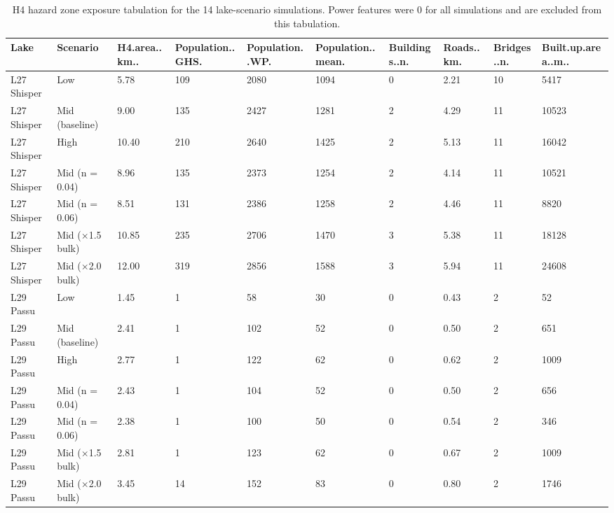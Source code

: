 \begin{table}[ht]
\centering
\scriptsize
\caption{H4 hazard zone exposure tabulation for the 14 lake-scenario simulations. Power features were 0 for all simulations and are excluded from this tabulation.}
\label{tab:h4_exposure}
\begin{tabular}{llllllllll}
\hline
Lake & Scenario & H4.area..km.. & Population..GHS. & Population..WP. & Population..mean. & Buildings..n. & Roads..km. & Bridges..n. & Built.up.area..m.. \\
\hline
L27 Shisper & Low &  5.78 & 109 & 2080 & 1094 & 0 & 2.21 & 10 &  5417 \\
L27 Shisper & Mid (baseline) &  9.00 & 135 & 2427 & 1281 & 2 & 4.29 & 11 & 10523 \\
L27 Shisper & High & 10.40 & 210 & 2640 & 1425 & 2 & 5.13 & 11 & 16042 \\
L27 Shisper & Mid (n = 0.04) &  8.96 & 135 & 2373 & 1254 & 2 & 4.14 & 11 & 10521 \\
L27 Shisper & Mid (n = 0.06) &  8.51 & 131 & 2386 & 1258 & 2 & 4.46 & 11 &  8820 \\
L27 Shisper & Mid ($\times$1.5 bulk) & 10.85 & 235 & 2706 & 1470 & 3 & 5.38 & 11 & 18128 \\
L27 Shisper & Mid ($\times$2.0 bulk) & 12.00 & 319 & 2856 & 1588 & 3 & 5.94 & 11 & 24608 \\
L29 Passu & Low &  1.45 &   1 &   58 &   30 & 0 & 0.43 &  2 &    52 \\
L29 Passu & Mid (baseline) &  2.41 &   1 &  102 &   52 & 0 & 0.50 &  2 &   651 \\
L29 Passu & High &  2.77 &   1 &  122 &   62 & 0 & 0.62 &  2 &  1009 \\
L29 Passu & Mid (n = 0.04) &  2.43 &   1 &  104 &   52 & 0 & 0.50 &  2 &   656 \\
L29 Passu & Mid (n = 0.06) &  2.38 &   1 &  100 &   50 & 0 & 0.54 &  2 &   346 \\
L29 Passu & Mid ($\times$1.5 bulk) &  2.81 &   1 &  123 &   62 & 0 & 0.67 &  2 &  1009 \\
L29 Passu & Mid ($\times$2.0 bulk) &  3.45 &  14 &  152 &   83 & 0 & 0.80 &  2 &  1746 \\
\hline
\end{tabular}
\end{table}
